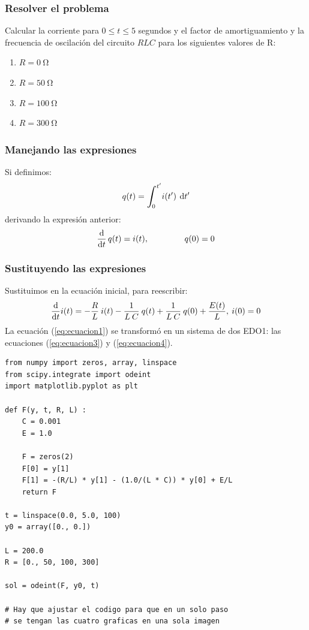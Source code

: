 \documentclass[12pt]{beamer}
\begin{document}
\begin{frame}
\frametitle{Resolver el problema}
Calcular la corriente para $0 \leq t \leq 5$ segundos y el factor de amortiguamiento y la frecuencia de oscilación del circuito $RLC$ para los siguientes valores de R:
\pause
{}
\begin{enumerate}[<+->]
\item $R = \SI{0}{\ohm}$
\item $R = \SI{50}{\ohm}$
\item $R = \SI{100}{\ohm}$
\item $R = \SI{300}{\ohm}$
\end{enumerate}
\end{frame}
\begin{frame}
\frametitle{Manejando las expresiones}
Si definimos:
\pause
\begin{equation}\label{eq:ecuacion2}
q (t) = \scaleint{6ex}_{\bs 0}^{\pderivada{t}} i (\pderivada{t}) \: \dd{\pderivada{t}}
\end{equation}
\pause
derivando la expresión anterior:
\pause
\begin{equation}\label{eq:ecuacion3}
\dv{t} \, q(t) = i (t), \hspace{1.5cm} q (0) = 0
\end{equation}
\end{frame}
\begin{frame}
\frametitle{Sustituyendo las expresiones}
Sustituimos en la ecuación inicial, para reescribir:
\pause
\begin{equation}\label{eq:ecuacion4}
\dv{t} i (t) = -\dfrac{R}{L} \: i (t) - \dfrac{1}{L \: C} \: q(t) + \dfrac{1}{L \: C} \: q(0) + \dfrac{E (t)}{L}, \: i(0) =  0 
\end{equation}
La ecuación (\ref{eq:ecuacion1}) se transformó en un sistema de dos EDO1: las ecuaciones (\ref{eq:ecuacion3}) y (\ref{eq:ecuacion4}).
\end{frame}
\begin{frame}
\begin{lstlisting}[caption=Código para el circuito RLC]
from numpy import zeros, array, linspace
from scipy.integrate import odeint
import matplotlib.pyplot as plt

def F(y, t, R, L) : 
    C = 0.001
    E = 1.0
            
    F = zeros(2)
    F[0] = y[1]
    F[1] = -(R/L) * y[1] - (1.0/(L * C)) * y[0] + E/L
    return F

t = linspace(0.0, 5.0, 100)
y0 = array([0., 0.])

L = 200.0
R = [0., 50, 100, 300]

sol = odeint(F, y0, t)

# Hay que ajustar el codigo para que en un solo paso
# se tengan las cuatro graficas en una sola imagen
\end{lstlisting}
\end{frame}
\end{document}
